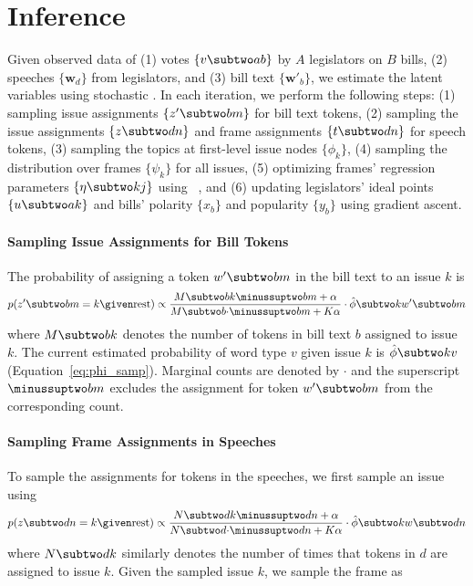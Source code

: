 
\section{Inference}
\label{sec:c6_inference}




Given observed data of (1) votes $\{v \subtwo ab\}$ by $A$ legislators
on $B$ bills, (2) speeches $\{\bm w_d\}$ from legislators, and
(3) bill text $\{\bm w'_b\}$, we estimate the latent variables using stochastic
. In each iteration, we perform the following steps: (1) sampling issue assignments
$\{z' \subtwo bm\}$ for bill text tokens, (2) sampling the
issue assignments $\{z \subtwo dn\}$ and frame assignments $\{t
\subtwo dn\}$ for speech tokens, (3) sampling the topics at
first-level issue nodes $\{\phi_k\}$, (4) sampling the distribution
over frames $\{\psi_k\}$ for all issues, (5) optimizing frames'
regression parameters $\{\eta \subtwo kj\}$ using
~\cite{Liu:MP89:lbfgs}, and (6) updating legislators' ideal points $\{u \subtwo ak\}$ and bills'
polarity $\{x_b\}$ and popularity $\{y_b\}$ using gradient ascent.

\paragraph{Sampling Issue Assignments for Bill Tokens}
\label{subsec:c6_sample_zprime}

The probability of assigning a token $w' \subtwo bm$ in the bill text
to an issue $k$ is
\begin{equation}
  p(z' \subtwo bm = k \given \mbox{rest}) \propto
  \frac{M \subtwo bk \minussuptwo bm + \alpha}{M \subtwo b{\cdot} \minussuptwo bm + K \alpha} \cdot
  \hat{\phi} \subtwo k{w' \subtwo bm}
\end{equation}
where $M \subtwo bk$ denotes the number of tokens in bill text $b$
assigned to issue $k$.  The current estimated probability of
word type $v$ given issue $k$ is $\hat{\phi} \subtwo kv$
(Equation~\ref{eq:phi_samp}). Marginal counts are denoted by $\cdot$
and the superscript $\minussuptwo bm$ excludes the assignment for
token $w' \subtwo bm$ from the corresponding count.

\paragraph{Sampling Frame Assignments in Speeches}
\label{subsec:c6_sample_zt}

To sample the assignments for tokens in the speeches, we first sample
an issue using
\begin{equation}
  p(z \subtwo dn = k \given \mbox{rest}) \propto
  \frac{N \subtwo dk \minussuptwo dn + \alpha}{N \subtwo d{\cdot} \minussuptwo dn + K \alpha} \cdot
  \hat{\phi} \subtwo k{w \subtwo dn}
\end{equation}
where $N \subtwo dk$ similarly denotes the number of times that tokens
in $d$ are assigned to issue $k$. Given the sampled issue $k$, we
sample the frame as

